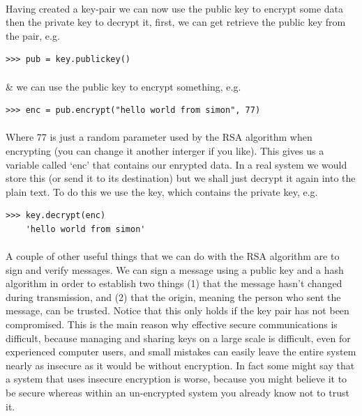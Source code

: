 \documentclass[12pt, a4paper, twoside]{book}
\begin{document}
\paragraph{} Having created a key-pair we can now use the public key to encrypt some data then the private key to decrypt it, first, we can get retrieve the public key from the pair, e.g.

\begin{lstlisting}[style=DOS]
    >>> pub = key.publickey()
\end{lstlisting}

\paragraph{} \& we can use the public key to encrypt something, e.g.

\begin{lstlisting}[style=DOS]
    >>> enc = pub.encrypt("hello world from simon", 77)
\end{lstlisting}

\paragraph{} Where 77 is just a random parameter used by the RSA algorithm when encrypting (you can change it another interger if you like). This gives us a variable called `enc' that contains our enrypted data. In a real system we would store this (or send it to its destination) but we shall just decrypt it again into the plain text. To do this we use the key, which contains the private key, e.g.

\begin{lstlisting}[style=DOS]
    >>> key.decrypt(enc)
    'hello world from simon'
\end{lstlisting}

\paragraph{} A couple of other useful things that we can do with the RSA algorithm are to sign and verify messages. We can sign a message using a public key and a hash algorithm in order to establish two things (1) that the message hasn't changed during transmission, and (2) that the origin, meaning the person who sent the message, can be trusted. Notice that this only holds if the key pair has not been compromised. This is the main reason why effective secure communications is difficult, because managing and sharing keys on a large scale is difficult, even for experienced computer users, and small mistakes can easily leave the entire system nearly as insecure as it would be without encryption. In fact some might say that a system that uses insecure encryption is worse, because you might believe it to be secure whereas within an un-encrypted system you already know not to trust it.
\end{document}

